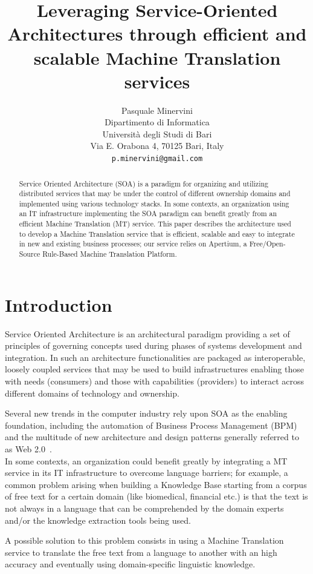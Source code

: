 \documentclass[11pt]{article}
\title{Leveraging Service-Oriented Architectures through efficient and scalable Machine Translation services}
\author{Pasquale Minervini\\
  Dipartimento di Informatica \\
  Università degli Studi di Bari \\
  Via E. Orabona 4, 70125 Bari, Italy \\
  {\tt p.minervini@gmail.com}}
\date{}
\begin{document}
\maketitle

\begin{abstract}
Service Oriented Architecture (SOA) is a paradigm for organizing and utilizing distributed services that may be under the 
control of different ownership domains and implemented using various technology stacks. In some contexts, an organization
using an IT infrastructure implementing the SOA paradigm can benefit greatly from an efficient Machine Translation (MT) service. 
This paper describes the architecture used to develop a Machine Translation service that is efficient, scalable and easy to 
integrate in new and existing business processes; our service relies on Apertium, a Free/Open-Source Rule-Based Machine Translation Platform.
\end{abstract}


\section{Introduction}

Service Oriented Architecture is an architectural paradigm providing  a set of principles of governing concepts used during phases 
of systems development and integration. In such an architecture functionalities are packaged as interoperable, loosely coupled
services that may be used to build infrastructures enabling those with needs (consumers) and those with capabilities (providers) 
to interact across different domains of technology and ownership.

Several new trends in the computer industry rely upon SOA as the enabling foundation, including the automation of Business Process 
Management (BPM) and the multitude of new architecture and design patterns generally referred to as Web 2.0~\citep{web20}.\\

In some contexts, an organization could benefit greatly by integrating a MT service in its IT infrastructure to overcome 
language barriers; for example, a common problem arising when building a Knowledge Base starting from a corpus of free text for
a certain domain (like biomedical, financial etc.) is that the text is not always in a language that can be comprehended by the
domain experts and/or the knowledge extraction tools being used.

A possible solution to this problem consists in using a Machine Translation service to translate the free text from a language to another with 
an high accuracy and eventually using domain-specific linguistic knowledge.\\%
\end{document}
